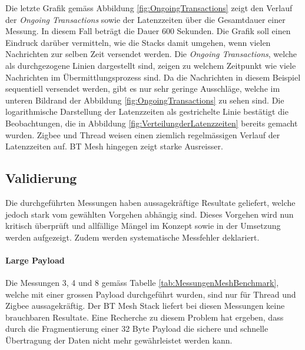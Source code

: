 Die letzte Grafik gemäss Abbildung \ref{fig:OngoingTransactions} zeigt den Verlauf der \textit{Ongoing Transactions} sowie der Latenzzeiten über die Gesamtdauer einer Messung.
In diesem Fall beträgt die Dauer 600 Sekunden.
Die Grafik soll einen Eindruck darüber vermitteln, wie die Stacks damit umgehen, wenn vielen Nachrichten zur selben Zeit versendet werden.
Die \textit{Ongoing Transactions}, welche als durchgezogene Linien dargestellt sind, zeigen zu welchem Zeitpunkt wie viele Nachrichten im Übermittlungsprozess sind.
Da die Nachrichten in diesem Beispiel sequentiell versendet werden, gibt es nur sehr geringe Ausschläge, welche im unteren Bildrand der Abbildung \ref{fig:OngoingTransactions} zu sehen sind.
Die logarithmische Darstellung der Latenzzeiten als gestrichelte Linie bestätigt die Beobachtungen, die in Abbildung  \ref{fig:VerteilungderLatenzzeiten} bereits gemacht wurden.
Zigbee und Thread weisen einen ziemlich regelmässigen Verlauf der Latenzzeiten auf.
BT Mesh hingegen zeigt starke Ausreisser.

\subsection{Validierung}\label{subsec:Validierung}
Die durchgeführten Messungen haben aussagekräftige Resultate geliefert, welche jedoch stark vom gewählten Vorgehen abhängig sind.
Dieses Vorgehen wird nun kritisch überprüft und allfällige Mängel im Konzept sowie in der Umsetzung werden aufgezeigt.
Zudem werden systematische Messfehler deklariert.

\paragraph{Large Payload}
Die Messungen 3, 4 und 8 gemäss Tabelle \ref{tab:MessungenMeshBenchmark}, welche mit einer grossen Payload durchgeführt wurden, sind nur für Thread und Zigbee aussagekräftig. Der BT Mesh Stack liefert bei diesen Messungen keine brauchbaren Resultate.
Eine Recherche zu diesem Problem hat ergeben, dass durch die Fragmentierung einer 32 Byte Payload die sichere und schnelle Übertragung der Daten nicht mehr gewährleistet werden kann.


